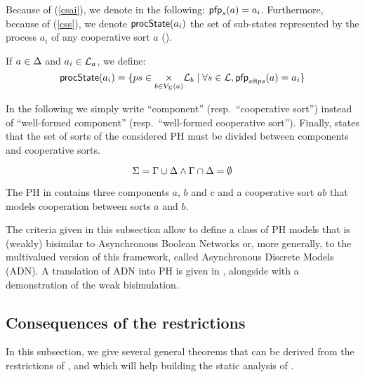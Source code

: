 Because of (\ref{csai}), we denote in the following: $\mathsf{pfp}_s(a) = a_i$.
Furthermore, because of (\ref{css}), we denote $\mathsf{procState}(a_i)$ the set of sub-states represented by the process $a_i$ of any cooperative sort $a$ ().
\begin{definition}[$\csState : \PHproc \rightarrow \powerset(\PHproc)$]
\label{def:csState}
  If $a \in \Delta$ and $a_i \in \mathcal{L}_a$, we define:
  $$\mathsf{procState}(a_i) = \{ ps \in \underset{b \in V_\Sigma(a)}{\times} \mathcal{L}_b \mid \forall s \in \mathcal{L}, \mathsf{pfp}_{s \Cap ps}(a) = a_i \}$$
\end{definition}

In the following we simply write “component” (resp.~“cooperative sort”) instead of “well-formed component” (resp.~“well-formed cooperative sort”).
Finally,  states that the set of sorts of the considered PH must be divided between components and cooperative sorts.
\begin{criterion}
\label{cr:compcs}
  $$\Sigma = \Gamma \cup \Delta \wedge \Gamma \cap \Delta = \emptyset$$
\end{criterion}

\begin{example}
  The PH in  contains three components $a$, $b$ and $c$ and a cooperative sort $ab$ that models cooperation between sorts $a$ and $b$.
\end{example}

The criteria given in this subsection allow to define a class of PH models that is (weakly) bisimilar to Asynchronous Boolean Networks
or, more generally, to the multivalued version of this framework, called Asynchronous Discrete Models (ADN).
A translation of ADN into PH is given in , alongside with a demonstration of the weak bisimulation.



\subsection{Consequences of the restrictions}

In this subsection, we give several general theorems that can be derived from the restrictions of ,
and which will help building the static analysis of .

